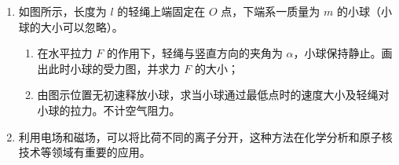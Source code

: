 \documentclass[\gkver]{gaokaozhenti}
\begin{document}
\begin{enumerate}
{⑤只改变小球的材质而其他条件不变，要使 $m_{2}$ 水平射程最大，则两球应发生完全弹性碰撞，即碰撞前后动量守恒且动能无损失，有 $m_{1}\cdot OM+m_{2}\cdot ON=m_{1}\cdot OP$，$m_{1}\cdot OM^{2}+m_{2}\cdot ON^{2}=m_{1}\cdot OP^{2}$，其中 $m_{1}=45.0\Ug$，$m_{2}=7.5\Ug$，$OP=44.80\Ucm$，解得 $ON=76.8\Ucm$。
}

\item
如图所示，长度为 $l$ 的轻绳上端固定在 $O$ 点，下端系一质量为 $m$ 的小球（小球的大小可以忽略）。

\begin{enumerate}
	\item
	在水平拉力 $F$ 的作用下，轻绳与竖直方向的夹角为 $\alpha$，小球保持静止。画出此时小球的受力图，并求力 $F$ 的大小；
	\item
	由图示位置无初速释放小球，求当小球通过最低点时的速度大小及轻绳对小球的拉力。不计空气阻力。
\end{enumerate}



\item
利用电场和磁场，可以将比荷不同的离子分开，这种方法在化学分析和原子核技术等领域有重要的应用。


\end{enumerate}
\end{document}
